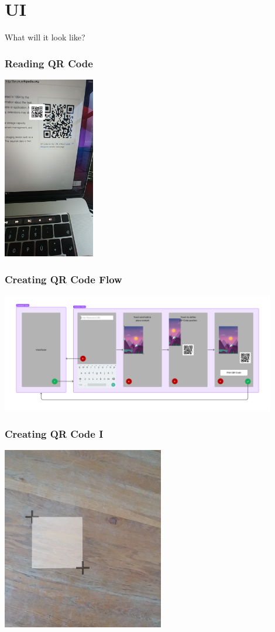 \documentclass{beamer}
\begin{document}
\section{UI}
\begin{frame}
	\begin{center}
		{\Huge What will it look like?}
	\end{center}
\end{frame}
\begin{frame}
  \frametitle{Reading QR Code}

  \includegraphics[height=8cm]{detect}
\end{frame}

\begin{frame}
  \frametitle{Creating QR Code Flow}

  \includegraphics[width=12cm]{UI-Mockup}
\end{frame}

\begin{frame}
  \frametitle{Creating QR Code I}
  \includegraphics[height=8cm]{span}
\end{frame}
\end{document}
